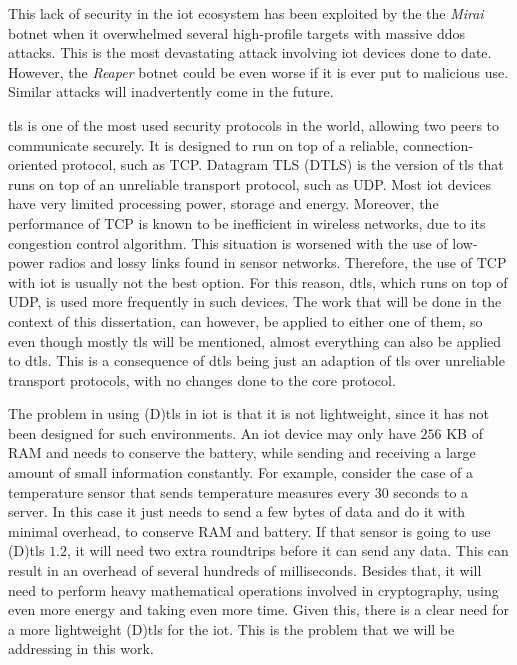 \documentclass[conference]{IEEEtran}
\begin{document}
This lack of security in the \gls{iot} ecosystem has been exploited by the
the \textit{Mirai} botnet\cite{sec17ant94:online} when it overwhelmed several high-profile
targets with massive \gls{ddos} attacks. This is the most devastating attack involving \gls{iot}
devices done to date. However, the \textit{Reaper} botnet\cite{ReaperCa10:online} could be
even worse if it is ever put to malicious use. Similar attacks will inadvertently
come in the future.

\gls{tls} is one of the most used security protocols in the world, allowing two peers
to communicate securely. It is designed to run on top of a reliable, connection-oriented
protocol, such as TCP. Datagram TLS (DTLS) is the version of \gls{tls} that runs on top
of an unreliable transport protocol, such as UDP. Most \gls{iot} devices have
very limited processing power, storage and energy. Moreover, the performance of
TCP is known to be inefficient in wireless networks, due to its congestion control
algorithm. This situation is worsened with the use of low-power radios and lossy
links found in sensor networks. Therefore, the use of TCP with \gls{iot}
is usually not the best option. For this reason, \gls{dtls}, which runs on top
of UDP, is used more frequently in such devices. The work that will be done in the context of this dissertation, can however,
be applied to either one of them, so even though mostly
\gls{tls} will be mentioned, almost everything can also be applied to \gls{dtls}. This is a consequence of \gls{dtls} being just an adaption of \gls{tls} over unreliable transport protocols, with no changes done to
the core protocol.

The problem in using (D)\gls{tls} in \gls{iot} is that it is not lightweight, since
it has not been designed for such environments. An \gls{iot} device may only have
$256$ KB of RAM and needs to conserve the battery, while sending and receiving
a large amount of small information constantly. For example, consider the case of a temperature sensor
that sends temperature measures every $30$ seconds to a server. In this case
it just needs to send a few bytes of data and do it with minimal overhead, to conserve
RAM and battery. If that sensor is going to use (D)\gls{tls} $1.2$, it will need
two extra roundtrips before it can send any data. This can result in an overhead of several hundreds of
milliseconds. Besides that, it will need to perform heavy mathematical operations
involved in cryptography, using even more energy and taking even more time.
Given this, there is a clear need for a more lightweight (D)\gls{tls} for the \gls{iot}. This is the problem that we will be addressing in this work.
\end{document}
